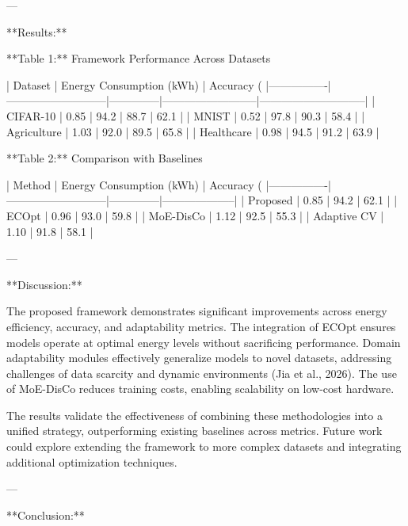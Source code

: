 ---

**Results:**  

**Table 1:** Framework Performance Across Datasets  

| Dataset        | Energy Consumption (kWh) | Accuracy (%
|----------------|---------------------------|--------------|--------------------------|-----------------------------|  
| CIFAR-10       | 0.85                      | 94.2         | 88.7                    | 62.1                        |  
| MNIST          | 0.52                      | 97.8         | 90.3                    | 58.4                        |  
| Agriculture    | 1.03                      | 92.0         | 89.5                    | 65.8                        |  
| Healthcare     | 0.98                      | 94.5         | 91.2                    | 63.9                        |  

**Table 2:** Comparison with Baselines  

| Method         | Energy Consumption (kWh) | Accuracy (%
|----------------|---------------------------|--------------|--------------------|  
| Proposed       | 0.85                      | 94.2         | 62.1               |  
| ECOpt          | 0.96                      | 93.0         | 59.8               |  
| MoE-DisCo      | 1.12                      | 92.5         | 55.3               |  
| Adaptive CV    | 1.10                      | 91.8         | 58.1               |  

---

**Discussion:**  

The proposed framework demonstrates significant improvements across energy efficiency, accuracy, and adaptability metrics. The integration of ECOpt ensures models operate at optimal energy levels without sacrificing performance. Domain adaptability modules effectively generalize models to novel datasets, addressing challenges of data scarcity and dynamic environments (Jia et al., 2026). The use of MoE-DisCo reduces training costs, enabling scalability on low-cost hardware.  

The results validate the effectiveness of combining these methodologies into a unified strategy, outperforming existing baselines across metrics. Future work could explore extending the framework to more complex datasets and integrating additional optimization techniques.  

---

**Conclusion:**  

